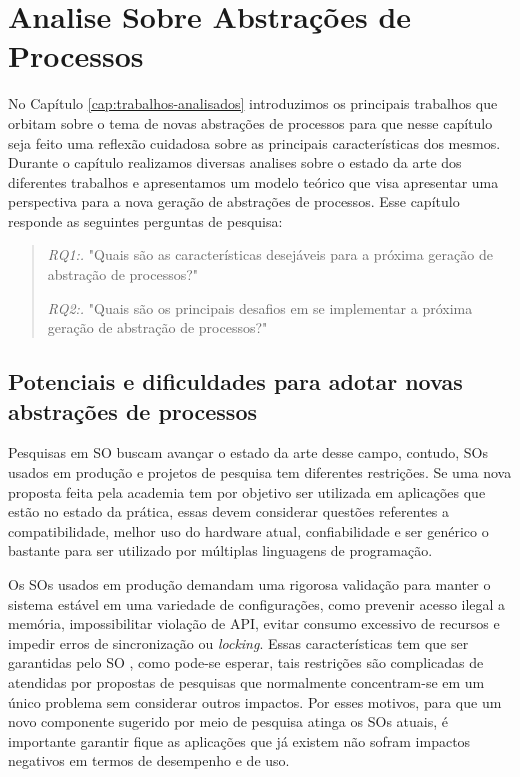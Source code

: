 \chapter{Analise Sobre Abstrações de Processos}
\label{cap:analise-sobre-abstracoes-de-processos}

No Capítulo \ref{cap:trabalhos-analisados} introduzimos os principais trabalhos
que orbitam sobre o tema de novas abstrações de processos para que nesse
capítulo seja feito uma reflexão cuidadosa sobre as principais características
dos mesmos. Durante o capítulo realizamos diversas analises sobre o estado da
arte dos diferentes trabalhos e apresentamos um modelo teórico que visa
apresentar uma perspectiva para a nova geração de abstrações de processos. Esse
capítulo responde as seguintes perguntas de pesquisa:

\begin{quote}
 \item \textit{RQ1:.} "Quais são as características desejáveis para a próxima geração de abstração de processos?"
 \item \textit{RQ2:.} "Quais são os principais desafios em se implementar a próxima geração de abstração de processos?"
\end{quote}


\section{Potenciais e dificuldades para adotar novas abstrações de processos}
\label{sec:potenciais}

Pesquisas em SO buscam avançar o estado da arte desse campo, contudo, SOs
usados em produção e projetos de pesquisa tem diferentes restrições. Se uma
nova proposta feita pela academia tem por objetivo ser utilizada em aplicações
que estão no estado da prática, essas devem considerar questões referentes
a compatibilidade, melhor uso do hardware atual, confiabilidade e ser genérico
o bastante para ser utilizado por múltiplas linguagens de programação.

Os SOs usados em produção demandam uma rigorosa validação para manter o sistema
estável em uma variedade de configurações, como prevenir acesso ilegal a
memória, impossibilitar violação de API, evitar consumo excessivo de recursos e
impedir erros de sincronização ou \textit{locking}. Essas características tem
que ser garantidas pelo SO \citep{mondrix}, como pode-se esperar, tais
restrições são complicadas de atendidas por propostas de pesquisas que
normalmente concentram-se em um único problema sem considerar outros impactos.
Por esses motivos, para que um novo componente sugerido por meio de pesquisa
atinga os SOs atuais, é importante garantir fique as aplicações que já existem
não sofram impactos negativos em termos de desempenho e de uso.

